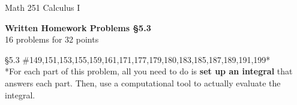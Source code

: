 \documentclass[11pt]{report}
\theoremstyle{plain}
\begin{document}
\hfill Math 251 Calculus I
\begin{center}
\Large{\textbf{Written Homework Problems \S 5.3}} \\
16 problems for 32 points\\
\end{center}

\begin{description}
\item{\S 5.3} \#149,151,153,155,159,161,171,177,179,180,183,185,187,189,191,199*\\

*For each part of this problem, all you need to do is \textbf{set up an integral} that answers each part. Then, use a computational tool to actually evaluate the integral.


\end{description}
\end{document}
